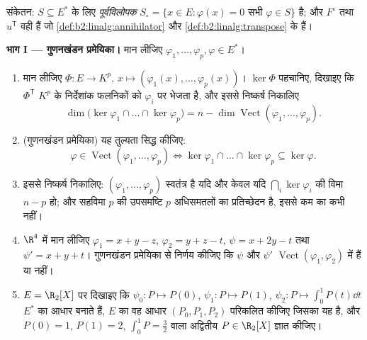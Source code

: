\begin{problem}[{सप्ताहांत समस्या --- परिमित विमा में द्वैतता
और फ्रेडहोम विकल्प}]
\label{pb:b2:linalg:1}
संकेतन: $S \subseteq E^*$ के लिए \emph{पूर्वविलोपक}
$S_\circ = \{x \in E : \varphi(x) = 0 \text{ सभी } \varphi
\in S\}$ है; और  $F^\circ$ तथा  $u^{\mathsf T}$ वही हैं जो
\cref{def:b2:linalg:annihilator} और \cref{def:b2:linalg:transpose} के हैं।

\medskip
\noindent\textbf{भाग I --- गुणनखंडन प्रमेयिका।} मान लीजिए $\varphi_1, \dots, \varphi_p, \varphi \in E^*$।
\begin{enumerate}
  \item मान लीजिए $\Phi \colon E \to K^p$, $x \mapsto (\varphi_1(x),
        \dots, \varphi_p(x))$। $\ker\Phi$ पहचानिए, दिखाइए कि $\Phi^{\mathsf T}$ $K^p$ के
        निर्देशांक फलनिकों को $\varphi_i$ पर भेजता है, और इससे निष्कर्ष
        निकालिए
        \[
        \dim \bigl(\ker\varphi_1 \cap \dots \cap
        \ker\varphi_p\bigr) = n - \dim
        \operatorname{Vect}(\varphi_1, \dots, \varphi_p).
        \]
  \item (गुणनखंडन प्रमेयिका) यह तुल्यता सिद्ध कीजिए:
        \[
        \varphi \in \operatorname{Vect}(\varphi_1, \dots,
        \varphi_p)
        \iff
        \ker\varphi_1 \cap \dots \cap \ker\varphi_p \subseteq
        \ker\varphi .
        \]
  \item इससे निष्कर्ष निकालिए: $(\varphi_1, \dots, \varphi_p)$ स्वतंत्र है यदि और केवल यदि $\bigcap_i \ker\varphi_i$ की
        विमा $n - p$ हो; और सहविमा $p$ की उपसमष्टि $p$ अधिसमतलों का
        प्रतिच्छेदन है, इससे कम का कभी नहीं।
  \item $\R^4$ में मान लीजिए $\varphi_1 = x + y - z$, $\varphi_2 = y +
        z - t$, $\psi = x + 2y - t$ तथा $\psi' = x + y + t$। गुणनखंडन
        प्रमेयिका से निर्णय कीजिए कि $\psi$ और $\psi'$ $\operatorname{Vect}(\varphi_1,
        \varphi_2)$ में हैं या
        नहीं।
  \item $E = \R_2[X]$ पर दिखाइए कि $\psi_0 \colon P \mapsto
        P(0)$, $\psi_1 \colon P \mapsto P(1)$, $\psi_2 \colon P
        \mapsto \int_0^1 P(t)\dd t$ $E^*$ का आधार बनाते हैं,
        $E$ का वह आधार $(P_0, P_1, P_2)$ परिकलित कीजिए जिसका यह  है, और $P(0)
        = 1$,
        $P(1) = 2$, $\int_0^1 P = \frac32$ वाला अद्वितीय $P \in \R_2[X]$ ज्ञात कीजिए।
\end{enumerate}


\end{problem}

